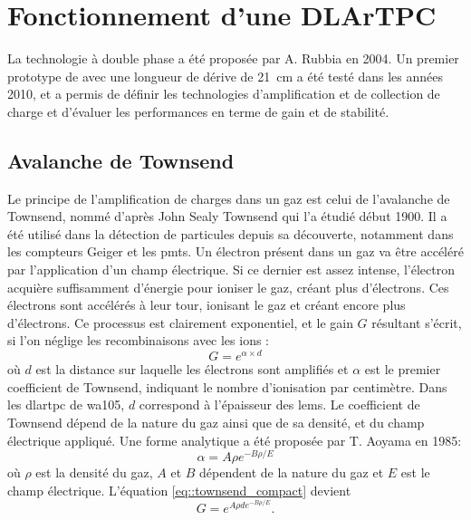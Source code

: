   \section{Fonctionnement d'une DLArTPC}\label{sec::dlartpc}
 
      La technologie à double phase a été proposée par A. Rubbia\cite{Rubbia2004} en 2004. Un premier prototype de \threeL{} avec une longueur de dérive de \SI{21}{\centi\meter} a été testé dans les années 2010, et a permis de définir les technologies d'amplification et de collection de charge\cite{Cantini2013} et d'évaluer les performances en terme de gain et de stabilité\cite{Cantini2014}.

    \subsection{Avalanche de Townsend}\label{sec::townsend}
      
      Le principe de l'amplification de charges dans un gaz est celui de l'avalanche de Townsend, nommé d'après John Sealy Townsend qui l'a étudié début 1900\cite{Townsend1910}. Il a été utilisé dans la détection de particules depuis sa découverte, notamment dans les compteurs Geiger et les \glspl{pmt}. Un électron présent dans un gaz va être accéléré par l'application d'un champ électrique. Si ce dernier est assez intense, l'électron acquière suffisamment d'énergie pour ioniser le gaz, créant plus d'électrons. Ces électrons sont accélérés à leur tour, ionisant le gaz et créant encore plus d'électrons. Ce processus est clairement exponentiel, et le gain $G$ résultant s'écrit, si l'on néglige les recombinaisons avec les ions :
      \begin{equation}\label{eq::townsend_compact}
        G = e^{\alpha\times d}
      \end{equation}
      où $d$ est la distance sur laquelle les électrons sont amplifiés et $\alpha$ est le premier coefficient de Townsend, indiquant le nombre d'ionisation par centimètre. Dans les \gls{dlartpc} de \gls{wa105}, $d$ correspond à l'épaisseur des \glspl{lem}. Le coefficient de Townsend dépend de la nature du gaz ainsi que de sa densité, et du champ électrique appliqué. Une forme analytique a été proposée par T. Aoyama en 1985\cite{Aoyama1985}:
      \begin{equation}\label{eq::townsend_coef}
        \alpha = A\rho e^{-B\rho/E}
      \end{equation}
      où $\rho$ est la densité du gaz, $A$ et $B$ dépendent de la nature du gaz et $E$ est le champ électrique. L'équation \eqref{eq::townsend_compact} devient
      \begin{equation}\label{eq::townsend}
        G = e^{A\rho  de^{-B\rho /E}}.
      \end{equation}


